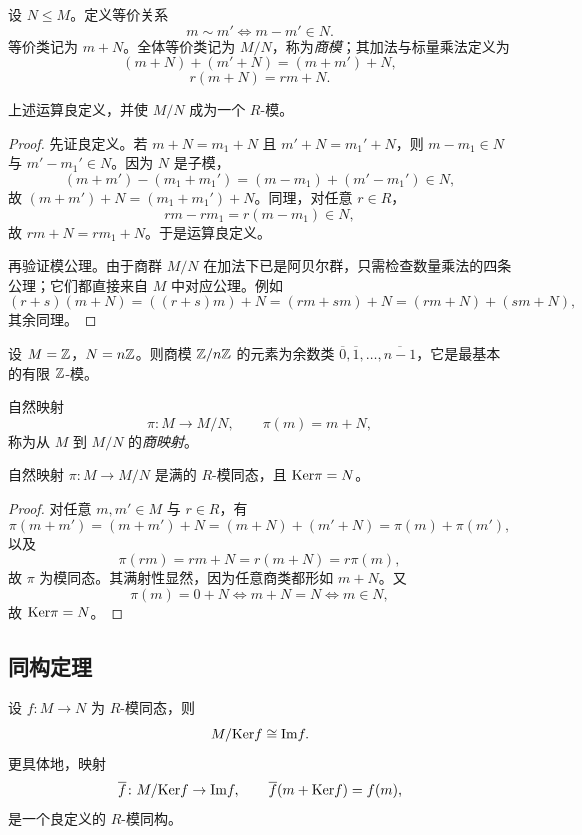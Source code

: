 \begin{definition}
设 $N\le M$。定义等价关系
\[
m\sim m'\iff m-m'\in N.
\]
等价类记为 $m+N$。全体等价类记为 $M/N$，称为\emph{商模}；其加法与标量乘法定义为
\[
(m+N)+(m'+N)=(m+m')+N,
\]
\[
r(m+N)=rm+N.
\]
\end{definition}

\begin{proposition}
上述运算良定义，并使 $M/N$ 成为一个 $R$-模。
\end{proposition}

\begin{proof}
先证良定义。若 $m+N=m_1+N$ 且 $m'+N=m_1'+N$，则 $m-m_1\in N$ 与 $m'-m_1'\in N$。因为 $N$ 是子模，
\[
(m+m')-(m_1+m_1')=(m-m_1)+(m'-m_1')\in N,
\]
故 $(m+m')+N=(m_1+m_1')+N$。同理，对任意 $r\in R$，
\[
rm-rm_1=r(m-m_1)\in N,
\]
故 $rm+N=rm_1+N$。于是运算良定义。

再验证模公理。由于商群 $M/N$ 在加法下已是阿贝尔群，只需检查数量乘法的四条公理；它们都直接来自 $M$ 中对应公理。例如
\[
(r+s)(m+N)=((r+s)m)+N=(rm+sm)+N=(rm+N)+(sm+N),
\]
其余同理。
\end{proof}

\begin{example}
设 $M=\mathbb{Z}$，$N=n\mathbb{Z}$。则商模 $\mathbb{Z}/n\mathbb{Z}$ 的元素为余数类 $\overline{0},\overline{1},\dots,\overline{n-1}$，它是最基本的有限 $\mathbb{Z}$-模。
\end{example}

\begin{definition}
自然映射
\[
\pi\colon M\to M/N,\qquad \pi(m)=m+N,
\]
称为从 $M$ 到 $M/N$ 的\emph{商映射}。
\end{definition}

\begin{proposition}
自然映射 $\pi\colon M\to M/N$ 是满的 $R$-模同态，且 $\mathrm{Ker} \pi=N$。
\end{proposition}

\begin{proof}
对任意 $m,m'\in M$ 与 $r\in R$，有
\[
\pi(m+m')=(m+m')+N=(m+N)+(m'+N)=\pi(m)+\pi(m'),
\]
以及
\[
\pi(rm)=rm+N=r(m+N)=r\pi(m),
\]
故 $\pi$ 为模同态。其满射性显然，因为任意商类都形如 $m+N$。又
\[
\pi(m)=0+N \iff m+N=N \iff m\in N,
\]
故 $\mathrm{Ker} \pi=N$。
\end{proof}

\subsection{同构定理}

\begin{theorem}[第一同构定理]
设 $f\colon M\to N$ 为 $R$-模同态，则
\[
M/\mathrm{Ker} f\cong \mathrm{Im} f.
\]
更具体地，映射
\[
\overline f\colon M/\mathrm{Ker} f\to \mathrm{Im} f,\qquad \overline f(m+\mathrm{Ker} f)=f(m),
\]
是一个良定义的 $R$-模同构。
\end{theorem}


